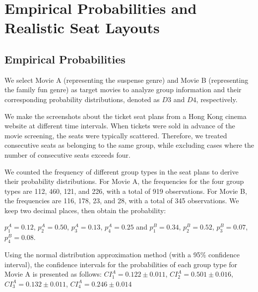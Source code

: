 \section{Empirical Probabilities and Realistic Seat Layouts}\label{appen_3}
\subsection{Empirical Probabilities}
We select Movie A (representing the suspense genre) and Movie B (representing the family fun genre) as target movies to analyze group information and their corresponding probability distributions, denoted as $D3$ and $D4$, respectively.






We make the screenshots about the ticket seat plans from a Hong Kong cinema website at different time intervals. When tickets were sold in advance of the movie screening, the seats were typically scattered. Therefore, we treated consecutive seats as belonging to the same group, while excluding cases where the number of consecutive seats exceeds four. 

We counted the frequency of different group types in the seat plans to derive their probability distributions. For Movie A, the frequencies for the four group types are 112, 460, 121, and 226, with a total of 919 observations. For Movie B, the frequencies are 116, 178, 23, and 28, with a total of 345 observations. We keep two decimal places, then obtain the probability:

$p_1^{A} =  0.12$, $p_2^{A} =  0.50$, $p_3^{A} = 0.13$, $p_4^{A} = 0.25$ and $p_1^{B} =  0.34$, $p_2^{B} =  0.52$, $p_3^{B} = 0.07$, $p_4^{B} = 0.08$.


Using the normal distribution approximation method (with a 95\% confidence interval), the confidence intervals for the probabilities of each group type for Movie A is presented as follows:
$CI_1^{A} =  0.122 \pm 0.011$, $CI_2^{A} =  0.501 \pm 0.016$, $CI_3^{A} = 0.132 \pm 0.011$, $CI_4^{A} = 0.246 \pm 0.014$

